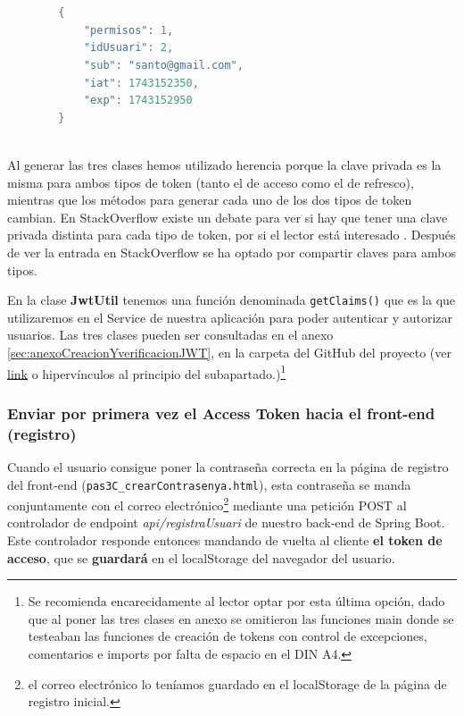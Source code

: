 \documentclass[a4paper,12pt]{report}
\begin{document}
		
\begin{lstlisting}[language=Java, basicstyle=\ttfamily\footnotesize, keywordstyle=\color{magenta}]
			
		
		{
		    "permisos": 1,
		    "idUsuari": 2,
		    "sub": "santo@gmail.com",
		    "iat": 1743152350,
		    "exp": 1743152950
		}
			
\end{lstlisting}
		
		
		
		
		
		Al generar las tres clases hemos utilizado herencia porque la clave privada es la misma para ambos tipos de token (tanto el de acceso como el de refresco), mientras que los métodos para generar cada uno de los dos tipos de token cambian. En StackOverflow existe un debate para ver si hay que tener una clave privada distinta para cada tipo de token, por si el lector está interesado \cite{stackoverflow_jwt_refresh_token_secret}. Después de ver la entrada en StackOverflow se ha optado por compartir claves para ambos tipos.
		
		
		En la clase \textbf{JwtUtil} tenemos una función denominada \texttt{getClaims()} que es la que utilizaremos en el Service de nuestra aplicación para poder autenticar y autorizar usuarios. Las tres clases pueden ser consultadas en el anexo \ref{sec:anexoCreacionYverificacionJWT}, en la carpeta del GitHub del proyecto (ver \href{https://github.com/blackcub3s/mercApp/blob/main/APP%20WEB/__springboot__produccio__/app/src/main/java/miApp/app/seguretat/jwt}{link} o hipervínculos al principio del subapartado.)\footnote{Se recomienda encarecidamente al lector optar por esta última opción, dado que al poner las tres clases en anexo se omitieron las funciones main donde se testeaban las funciones de creación de tokens con control de excepciones, comentarios e imports por falta de espacio en el DIN A4.} 
		
		\subsubsection{Enviar por primera vez el Access Token hacia el front-end (registro)}
		\label{sec:enviarPorPrimeraVezAccesTokenDESDEBACKEND}
		
		Cuando el usuario consigue poner la contraseña correcta en la página de registro del front-end (\texttt{pas3C\_crearContrasenya.html}), esta contraseña se manda conjuntamente con el correo electrónico\footnote{el correo electrónico  lo teníamos guardado en el localStorage de la página de registro inicial.}  mediante una petición POST al controlador de endpoint \textit{api/registraUsuari} de nuestro back-end de Spring Boot. Este controlador responde entonces mandando de vuelta al cliente \textbf{el token de acceso}, que se \textbf{guardará} en el localStorage del navegador del usuario.
		
\end{document}
